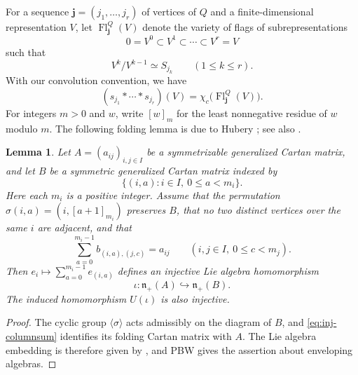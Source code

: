 \documentclass[12pt,reqno]{amsart}
\numberwithin{equation}{section}
\newtheorem{lemma}[theorem]{Lemma}
\theoremstyle{definition}
\theoremstyle{remark}
\newcommand{\nplus}{\mathfrak n_+}
\newcommand{\Fl}{\operatorname{Fl}}
\theoremstyle{plain}
\theoremstyle{plain}
\begin{document}

   For a sequence $\mathbf j=(j_1,\ldots,j_r)$ of vertices of $Q$ and a finite-dimensional representation $V$, let $\Fl^{Q}_{\mathbf j}(V)$ denote the variety of flags of subrepresentations
\[
   0=V^0\subset V^1\subset\cdots\subset V^r=V
\]
  such that
\[
  V^k/V^{k-1}\simeq S_{j_k} \qquad (1\leq k\leq r).
\]
  With our convolution convention, we have
\begin{equation}\label{eq:inj-Q-flags}
  (s_{j_1}*\cdots*s_{j_r})(V) = \chi_c\bigl(\Fl^{Q}_{\mathbf j}(V)\bigr).
\end{equation}
For integers $m>0$ and $w$, write $[w]_{m}$ for the least nonnegative residue of $w$ modulo $m$. The following folding lemma is due to Hubery \cite[Theorem~7.1.5]{Hub02}; see also \cite[Proposition~4.4]{Dem11}.

\begin{lemma}\label{lem:inj-cover}
Let $A=(a_{ij})_{i,j\in I}$ be a symmetrizable generalized Cartan matrix, and let $B$ be a symmetric generalized Cartan matrix indexed by
\[
\{(i,a):i\in I,\ 0\leq a<m_i\}.
\]
Here each $m_i$ is a positive integer. Assume that the permutation $\sigma(i,a)=(i,[a+1]_{m_i})$ preserves $B$, that no two distinct vertices over the same $i$ are adjacent, and that
\begin{equation}\label{eq:inj-columnsum}
\sum_{a=0}^{m_i-1}b_{(i,a),(j,c)}
=
a_{ij}
\qquad
(i,j\in I,\ 0\leq c<m_j).
\end{equation}
Then $e_i\longmapsto \sum_{a=0}^{m_i-1}e_{(i,a)}$ defines an injective Lie algebra homomorphism
\[
\iota\colon
\nplus(A)\hookrightarrow\nplus(B).
\]
The induced homomorphism $U(\iota)$ is also injective.
\end{lemma}

\begin{proof}
The cyclic group $\langle\sigma\rangle$ acts admissibly on the diagram of $B$, and \eqref{eq:inj-columnsum} identifies its folding Cartan matrix with $A$. The Lie algebra embedding is therefore given by \cite[Proposition~4.4]{Dem11}, and PBW gives the assertion about enveloping algebras.
\end{proof}
\end{document}
